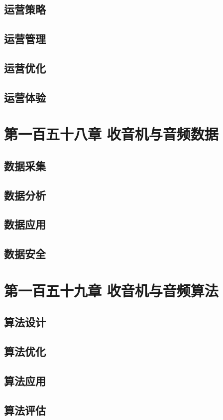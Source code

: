 \documentclass[12pt,UTF8]{ctexbook}
\begin{document}
\section{运营策略}
\section{运营管理}
\section{运营优化}
\section{运营体验}

\chapter{第一百五十八章 收音机与音频数据}

\section{数据采集}
\section{数据分析}
\section{数据应用}
\section{数据安全}

\chapter{第一百五十九章 收音机与音频算法}

\section{算法设计}
\section{算法优化}
\section{算法应用}
\section{算法评估}
\end{document}
